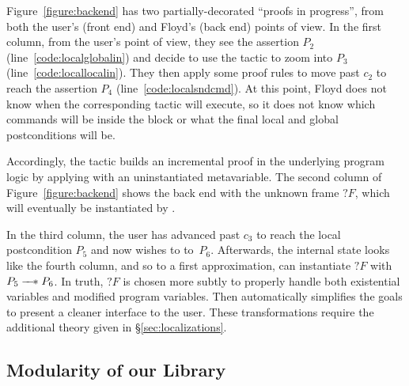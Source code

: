 Figure~\ref{figure:backend} has two partially-decorated ``proofs in progress'', from both the user's (front end) and Floyd's (back end) points of view.  In the first column, from the user's point of view, they see the assertion $P_2$ (line~\ref{code:localglobalin}) and decide to use the  tactic to zoom into $P_3$ (line~\ref{code:locallocalin}).  They then apply some proof rules to move past $c_2$ to reach the assertion $P_4$ (line~\ref{code:localsndcmd}).  At this point, Floyd does not know when the corresponding  tactic will execute, so it does not know which commands will be inside the block or what the final local and global postconditions will be.

Accordingly, the  tactic builds an incremental proof in the underlying program logic by applying  with an uninstantiated metavariable.
The second column of Figure~\ref{figure:backend} shows the back end with the unknown frame $?F$, which will eventually be instantiated by .

In the third column, the user has advanced past $c_3$ to reach the local postcondition $P_5$ and now wishes to  to~$P_6$.  Afterwards, the internal state looks like the fourth column, and so to a first approximation,  can instantiate $?F$ with $P_5 \mathrel{\mbox{$\hspace*{-0.03em}\mathord{-}\hspace*{-0.4em} \mathord{-}\hspace*{-0.13em} \mathord{\mathbin{\ast}}$\hspace*{-0.005em}}} P_6$.  In truth, $?F$ is chosen more subtly to properly handle both existential variables and modified program variables. Then  automatically simplifies the goals to present a cleaner interface to the user.  These transformations require the additional theory given in \S\ref{sec:localizations}.

\subsection{Modularity of our Library}
\label{sec:modularlibrary}

